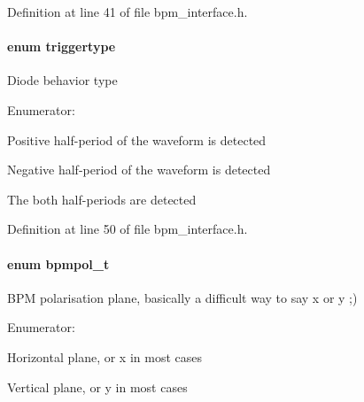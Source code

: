 Definition at line 41 of file bpm\_\-interface.h.
\paragraph[triggertype]{\setlength{\rightskip}{0pt plus 5cm}enum {\bf triggertype}}\hfill\label{group__interface_g92578d8fae7b954bc7642f271e948c71}


Diode behavior type \begin{Desc}
\item[Enumerator: ]\par
\begin{description}
\item[{\em 
positive\label{group__interface_gg92578d8fae7b954bc7642f271e948c71f3e33603bf389e5b337ee5bdbc9558b9}
}]Positive half-period of the waveform is detected \item[{\em 
negative\label{group__interface_gg92578d8fae7b954bc7642f271e948c717b1174d620ccd8d2a049d8440aa1fc4d}
}]Negative half-period of the waveform is detected \item[{\em 
bipolar\label{group__interface_gg92578d8fae7b954bc7642f271e948c71af941ae00aea56c2981c12f5848e4df5}
}]The both half-periods are detected \end{description}
\end{Desc}



Definition at line 50 of file bpm\_\-interface.h.
\paragraph[bpmpol\_\-t]{\setlength{\rightskip}{0pt plus 5cm}enum {\bf bpmpol\_\-t}}\hfill\label{group__interface_g9c184538bd4a8c4dde8c1f866a85d2eb}


BPM polarisation plane, basically a difficult way to say x or y ;) \begin{Desc}
\item[Enumerator: ]\par
\begin{description}
\item[{\em 
horiz\label{group__interface_gg9c184538bd4a8c4dde8c1f866a85d2eb77e41753a8557ea24545d931e5facc33}
}]Horizontal plane, or x in most cases \item[{\em 
vert\label{group__interface_gg9c184538bd4a8c4dde8c1f866a85d2eb834932d06c05afc78322a5bbf48d72b9}
}]Vertical plane, or y in most cases \end{description}
\end{Desc}



